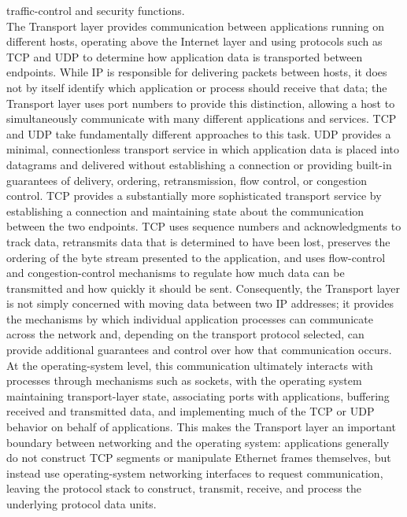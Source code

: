 \documentclass[12pt]{article}
\begin{document}
traffic-control and security functions.\\

The Transport layer provides communication between applications running on different hosts, operating above the Internet layer and using protocols such as TCP and UDP to determine how application data is transported between endpoints. While IP is responsible for delivering packets between hosts, it does not by itself identify which application or process should receive that data; the Transport layer uses port numbers to provide this distinction, allowing a host to simultaneously communicate with many different applications and services. TCP and UDP take fundamentally different approaches to this task. UDP provides a minimal, connectionless transport service in which application data is placed into datagrams and delivered without establishing a connection or providing built-in guarantees of delivery, ordering, retransmission, flow control, or congestion control. TCP provides a substantially more sophisticated transport service by establishing a connection and maintaining state about the communication between the two endpoints. TCP uses sequence numbers and acknowledgments to track data, retransmits data that is determined to have been lost, preserves the ordering of the byte stream presented to the application, and uses flow-control and congestion-control mechanisms to regulate how much data can be transmitted and how quickly it should be sent. Consequently, the Transport layer is not simply concerned with moving data between two IP addresses; it provides the mechanisms by which individual application processes can communicate across the network and, depending on the transport protocol selected, can provide additional guarantees and control over how that communication occurs. At the operating-system level, this communication ultimately interacts with processes through mechanisms such as sockets, with the operating system maintaining transport-layer state, associating ports with applications, buffering received and transmitted data, and implementing much of the TCP or UDP behavior on behalf of applications. This makes the Transport layer an important boundary between networking and the operating system: applications generally do not construct TCP segments or manipulate Ethernet frames themselves, but instead use operating-system networking interfaces to request communication, leaving the protocol stack to construct, transmit, receive, and process the underlying protocol data units.\\
\end{document}

